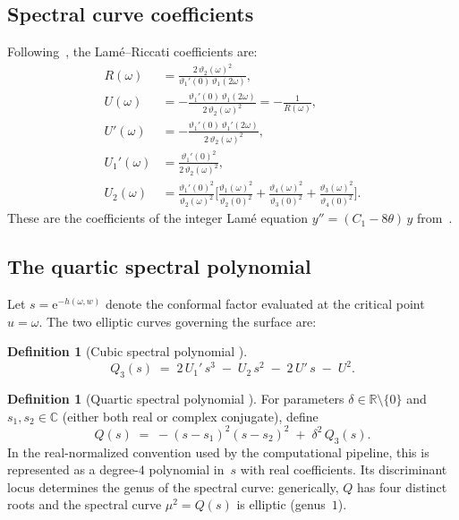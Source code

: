 \documentclass[11pt,a4paper]{article}
\theoremstyle{plain}
\theoremstyle{definition}
\newtheorem{definition}[theorem]{Definition}
\theoremstyle{remark}
\newcommand{\vt}[1]{\vartheta_{#1}}     %
\newcommand{\CC}{\mathbb{C}}
\newcommand{\RR}{\mathbb{R}}
\newcommand{\ee}{\mathrm{e}}
\begin{document}
\subsection{Spectral curve coefficients}\label{sec:coeff}
Following~\cite[Section~3.2]{BHS-comp}, the Lam\'e--Riccati
coefficients are:
\begin{align}
  R(\omega) &= \frac{2\,\vt{2}(\omega)^2}
    {\vt{1}'(0)\,\vt{1}(2\omega)},
  \label{eq:Romega} \\
  U(\omega) &= -\frac{\vt{1}'(0)\,\vt{1}(2\omega)}
    {2\,\vt{2}(\omega)^2}
  = -\frac{1}{R(\omega)},
  \label{eq:U} \\
  U'(\omega) &= -\frac{\vt{1}'(0)\,\vt{1}'(2\omega)}
    {2\,\vt{2}(\omega)^2},
  \label{eq:Uprime} \\
  U_1'(\omega) &= \frac{\vt{1}'(0)^2}
    {2\,\vt{2}(\omega)^2},
  \label{eq:U1prime} \\
  U_2(\omega) &= \frac{\vt{1}'(0)^2}{\vt{2}(\omega)^2}
    \biggl[
      \frac{\vt{1}(\omega)^2}{\vt{2}(0)^2}
    + \frac{\vt{4}(\omega)^2}{\vt{3}(0)^2}
    + \frac{\vt{3}(\omega)^2}{\vt{4}(0)^2}
    \biggr].
  \label{eq:U2}
\end{align}
These are the coefficients of the integer Lam\'e equation
$y'' = (C_1 - 8\theta)\,y$ from~\cite[Lemma~1]{BHS-comp}.

\subsection{The quartic spectral polynomial}\label{sec:Q}
Let $s = \ee^{-h(\omega,w)}$ denote the conformal factor evaluated at
the critical point $u=\omega$.  The two elliptic curves governing the
surface are:

\begin{definition}[Cubic spectral polynomial {\cite[Eq.~58]{BHS-comp}}]
\label{def:Q3}
\begin{equation}
  Q_3(s) \;=\; 2\,U_1'\,s^3 \;-\; U_2\,s^2
    \;-\; 2\,U'\,s \;-\; U^2.
  \label{eq:Q3}
\end{equation}
\end{definition}

\begin{definition}[Quartic spectral polynomial
  {\cite[Theorem~9]{BHS-comp}}]
\label{def:Q}
For parameters $\delta \in \RR \setminus \{0\}$ and
$s_1, s_2 \in \CC$ (either both real or complex conjugate), define
\begin{equation}
  Q(s) \;=\; -(s - s_1)^2(s - s_2)^2 \;+\; \delta^2\,Q_3(s).
  \label{eq:Q}
\end{equation}
In the real-normalized convention used by the computational pipeline,
this is represented as a degree-$4$ polynomial in~$s$ with real
coefficients.  Its
discriminant locus determines the genus of the spectral curve:
generically, $Q$ has four distinct roots and the spectral curve
$\mu^2 = Q(s)$ is elliptic (genus~$1$).
\end{definition}
\end{document}
